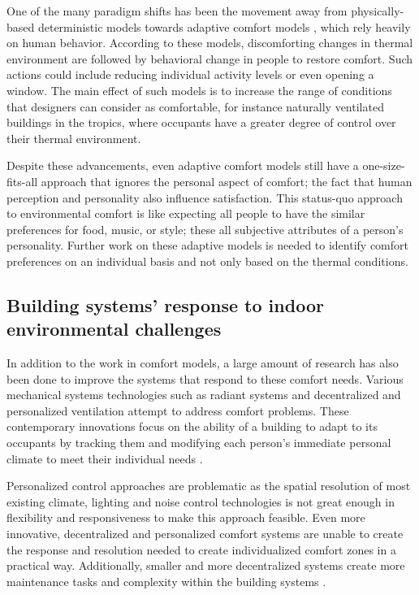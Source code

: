 \documentclass[]{interact}
\theoremstyle{plain}%
\theoremstyle{definition}
\theoremstyle{remark}
\begin{document}
One of the many paradigm shifts has been the movement away from physically-based deterministic models towards adaptive comfort models \citep{Ferrari2012AdaptiveIndices, Nicol2013AdaptiveWorld, vanHoof2010ThermalPractice}, which rely heavily on human behavior. According to these models, discomforting changes in thermal environment are followed by behavioral change in people to restore comfort. Such actions could include reducing individual activity levels or even opening a window. The main effect of such models is to increase the range of conditions that designers can consider as comfortable, for instance naturally ventilated buildings in the tropics, where occupants have a greater degree of control over their thermal environment. 

Despite these advancements, even adaptive comfort models still have a one-size-fits-all approach that ignores the personal aspect of comfort; the fact that human perception and personality also influence satisfaction. This status-quo approach to environmental comfort is like expecting all people to have the similar preferences for food, music, or style; these all subjective attributes of a person’s personality. Further work on these adaptive models is needed to identify comfort preferences on an individual basis and not only based on the thermal conditions. 



\subsection{Building systems’ response to indoor environmental challenges}
In addition to the work in comfort models, a large amount of research has also been done to improve the systems that respond to these comfort needs. Various mechanical systems technologies such as radiant systems and decentralized and personalized ventilation attempt to address comfort problems. These contemporary innovations focus on the ability of a building to adapt to its occupants by tracking them and modifying each person's immediate personal climate to meet their individual needs \citep{Brager2015EvolvingComfort}. 

Personalized control approaches are problematic as the spatial resolution of most existing climate, lighting and noise control technologies is not great enough in flexibility and responsiveness to make this approach feasible. Even more innovative, decentralized and personalized comfort systems are unable to create the response and resolution needed to create individualized comfort zones in a practical way. Additionally, smaller and more decentralized systems create more maintenance tasks and complexity within the building systems \citep{VESELY2017223} .
\end{document}
